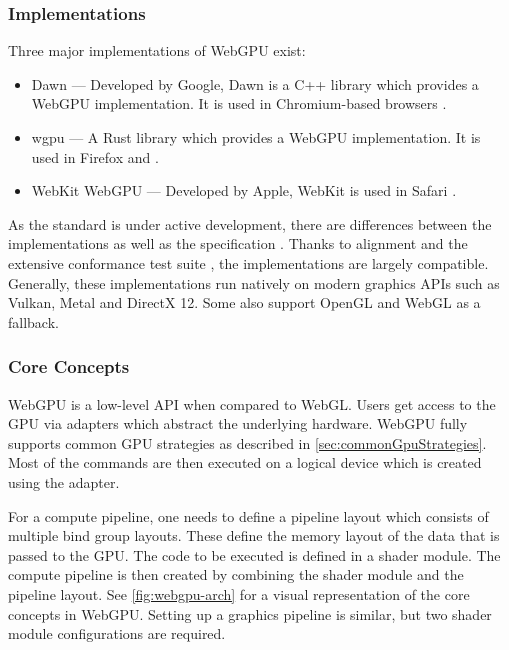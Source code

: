 \subsubsection{Implementations}

Three major implementations of \gls{WebGPU} exist:

\begin{itemize}
    \item{\gls{Dawn}} — Developed by Google, \gls{Dawn} is a C++ library which provides a \gls{WebGPU} implementation. It is used in Chromium-based browsers \cite{dawnImplementation}.
    \item{\gls{wgpu}} — A Rust library which provides a \gls{WebGPU} implementation. It is used in Firefox and  \cite{wgpuImplementation}.
    \item{WebKit WebGPU} — Developed by Apple, WebKit is used in Safari \cite{webKitWebGPUImplementation}.
\end{itemize}

As the standard is under active development, there are differences between the implementations as well as the specification \cite{wgpuStandardDeviation}. Thanks to alignment and the extensive conformance test suite \cite{WebGPUConformanceTestSuite}, the implementations are largely compatible. Generally, these implementations run natively on modern graphics \glspl{API} such as \gls{Vulkan}, \gls{Metal} and \gls{DirectX 12}. Some also support \gls{OpenGL} and \gls{WebGL} as a fallback.

\subsubsection{Core Concepts}

\gls{WebGPU} is a low-level \gls{API} when compared to \gls{WebGL}. Users get access to the \gls{GPU} via adapters which abstract the underlying hardware. \gls{WebGPU} fully supports common \gls{GPU} strategies as described in \autoref{sec:commonGpuStrategies}. Most of the commands are then executed on a logical device which is created using the adapter.

For a compute pipeline, one needs to define a pipeline layout which consists of multiple bind group layouts. These define the memory layout of the data that is passed to the \gls{GPU}. The code to be executed is defined in a shader module. The compute pipeline is then created by combining the shader module and the pipeline layout. See \autoref{fig:webgpu-arch} for a visual representation of the core concepts in \gls{WebGPU}. Setting up a graphics pipeline is similar, but two shader module configurations are required.


